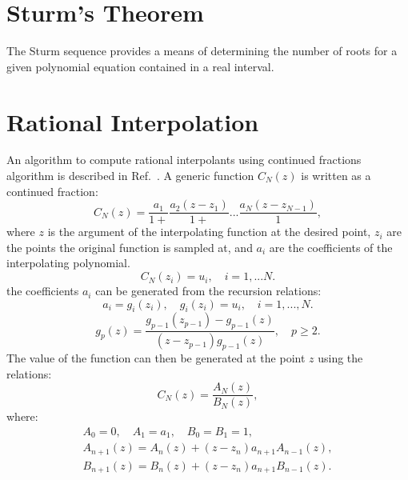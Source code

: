 \section{Sturm's Theorem}
The Sturm sequence provides a means of determining the number of 
roots for a given polynomial equation contained in a real interval.

\section{Rational Interpolation}
\label{app:ratint}
An algorithm to compute rational interpolants 
using continued fractions algorithm is described in Ref.~\cite{vidbergserene77}.
A generic function $C_N(z)$ is written as a continued fraction:
%
\begin{equation}
C_{N}(z) = \frac{a_{1}}{1+}\frac{a_{2}(z-z_{1})}{1+}...\frac{a_{N}(z-z_{N-1})}{1},
\end{equation}
%
where $z$ is the argument of the interpolating function
at the desired point, $z_{i}$ are the points the original function is sampled at,
and $a_{i}$ are the coefficients of the interpolating polynomial.
%
\begin{equation}
C_{N}(z_{i}) = u_{i}, \quad i=1,...N.
\end{equation}
%
the coefficients $a_{i}$ can be generated from the recursion relations:
%
\begin{equation}
a_{i} = g_{i}(z_{i}),\quad g_{i}(z_{i})=u_{i},\quad i=1,...,N.
\end{equation}
%
\begin{equation}
g_{p}(z) = \frac{g_{p-1}(z_{p-1}) - g_{p-1}(z)}{(z - z_{p-1})g_{p-1}(z)}, \quad p \geq 2.
\end{equation}
%
The value of the function can then be generated at the point $z$ using the relations:
%
\begin{equation}
C_{N}(z) = \frac{A_{N}(z)}{B_{N}(z)},
\end{equation}
%
where:
%
\begin{eqnarray}
A_{0}=0, \quad A_{1} = a_{1}, \quad B_{0}=B_{1}=1, \nonumber \\
A_{n+1}(z) = A_{n}(z) + (z-z_{n})a_{n+1}A_{n-1}(z), \nonumber \\
B_{n+1}(z) = B_{n}(z) + (z-z_{n})a_{n+1}B_{n-1}(z).
\end{eqnarray}


